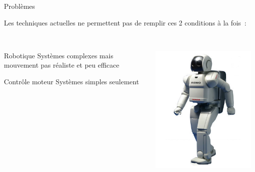 \begin{frame}{Problèmes}
    \begin{small}
        Les techniques actuelles ne permettent pas de remplir ces 2 conditions à la fois~:
        ~\\
        \begin{columns}
            \begin{column}{0.70\textwidth}
                \begin{block}{Robotique}
                    Systèmes complexes mais mouvement pas \og{}réaliste\fg{} et peu \og{}efficace\fg{} %
                \end{block}
                \begin{block}{Contrôle moteur}
                    Systèmes simples seulement %
                \end{block}
            \end{column}
            \begin{column}{0.30\textwidth}
                \begin{center}
                    \includegraphics[width=.95\linewidth]{fig/asimo}
                \end{center}
            \end{column}
        \end{columns}
    \end{small}
\end{frame}

